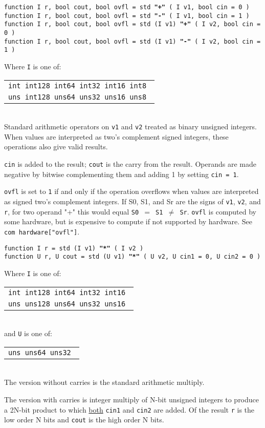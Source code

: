 \documentclass[12pt]{article}
\newcommand{\ttkey}[1]{{\tt \bfseries #1}}
\newenvironment{indpar}[1][0.3in]%
	{\begin{list}{}%
		     {\setlength{\itemsep}{0in}%
		      \setlength{\topsep}{0in}%
		      \setlength{\parsep}{1ex}%
		      \setlength{\labelwidth}{#1}%
		      \setlength{\leftmargin}{#1}%
		      \addtolength{\leftmargin}{\labelsep}}%
	 \item}%
	{\end{list}}
\begin{document}
{\tt function I r, bool cout, bool ovfl =
	std \ttkey{"+"} ( I v1, bool cin = 0 )} \\
{\tt function I r, bool cout, bool ovfl =
	std \ttkey{"-"} ( I v1, bool cin = 1 )} \\
{\tt function I r, bool cout, bool ovfl =
    std (I v1) \ttkey{"+"} ( I v2, bool cin = 0 )} \\
{\tt function I r, bool cout, bool ovfl =
    std (I v1) \ttkey{"-"} ( I v2, bool cin = 1 )}
\begin{indpar}
Where {\tt I} is one of:
	\begin{tabular}[t]{l}
	\tt int  int128 int64  int32  int16  int8 \\
	\tt uns  int128 uns64  uns32  uns16  uns8 \\
	\end{tabular}
\\[1ex]
Standard arithmetic operators on {\tt v1} and {\tt v2}
treated as binary unsigned integers.  When values are
interpreted as two's complement signed integers, these
operations also give valid results.

{\tt cin} is added to the result; {\tt cout} is the carry from
the result.  Operands are made negative by bitwise complementing
them and adding 1 by setting {\tt cin = 1}.

{\tt ovfl} is set to {\tt 1} if and only if the operation overflows
when values are interpreted as signed two's complement integers.
If S0, S1, and Sr are the signs of {\tt v1}, {\tt v2}, and {\tt r},
for two operand "+" this would equal {\tt S0 $=$ S1 $\neq$ Sr}.
{\tt ovfl} is computed by some hardware, but is expensive to
compute if not supported by hardware.  See
{\tt com hardware["ovfl"]}.

\end{indpar}

{\tt function I r = std (I v1) \ttkey{"*"} ( I v2 )} \\
{\tt function U r, U cout =
    std (U v1) \ttkey{"*"} ( U v2, U cin1 = 0, U cin2 = 0 )}
\begin{indpar}
Where {\tt I} is one of:
	\begin{tabular}[t]{l}
	\tt int  int128 int64  int32  int16 \\
	\tt uns  uns128 uns64  uns32  uns16 \\
	\end{tabular}
\\[1ex]
and {\tt U} is one of:
	\begin{tabular}[t]{l}
	\tt uns  uns64  uns32 \\
	\end{tabular}
\\[1ex]
The version without carries is the standard arithmetic multiply.

The version with carries is integer multiply of N-bit unsigned
integers to produce a 2N-bit product to which \underline{both}
{\tt cin1} and {\tt cin2} are
added.  Of the result {\tt r} is the low order N bits
and {\tt cout} is the high order N bits.

\end{indpar}
\end{document}

